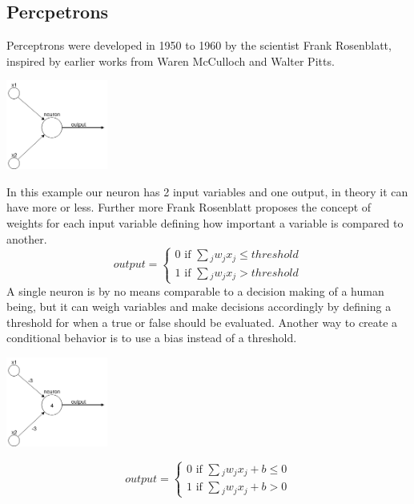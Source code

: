 \subsection{Percpetrons}
Perceptrons were developed in 1950 to 1960 by the scientist Frank Rosenblatt, inspired by earlier works from Waren McCulloch and Walter
Pitts.\cite{neuralnetworksanddeeplearning}
\begin{center}
    \includegraphics[width=0.25\textwidth]{images/neurons/simple_neuron.png}
\end{center}
In this example our neuron has 2 input variables and one output, in theory it can have more or less. Further more Frank Rosenblatt proposes
the concept of weights for each input variable defining how important a variable is compared to another.\\
\begin{equation*}
    output=
    \begin{cases}
        0 \text{ if } \sum{_j}{w_jx_j \le threshold}\\
        1 \text{ if } \sum{_j}{w_jx_j > threshold}
    \end{cases}
\end{equation*}
\newpage \noindent
A single neuron is by no means comparable to a decision making of a human being, but it can weigh variables and make decisions
accordingly by defining a threshold for when a true or false should be evaluated. Another way to create a conditional behavior is to use a bias
instead of a threshold.
\begin{center}
    \includegraphics[width=0.25\textwidth]{images/neurons/simple_neuron_bias.png}
\end{center}
\begin{equation*}
    output=
    \begin{cases}
        0 \text{ if } \sum{_j}{w_jx_j+b \le 0}\\
        1 \text{ if } \sum{_j}{w_jx_j+b > 0}
    \end{cases}
\end{equation*}
